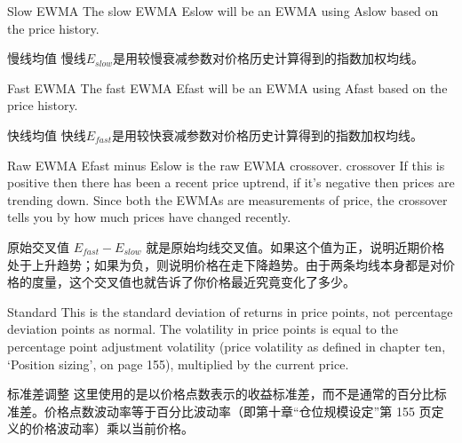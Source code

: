 \bipairgap

\begin{englishblock} Slow EWMA The slow EWMA Eslow will be an EWMA using Aslow based on the price history. \end{englishblock}

\begin{chineseblock}慢线均值 慢线\(E_{slow}\)是用较慢衰减参数对价格历史计算得到的指数加权均线。\end{chineseblock}

\bipairgap

\begin{englishblock} Fast EWMA The fast EWMA Efast will be an EWMA using Afast based on the price history. \end{englishblock}

\begin{chineseblock}快线均值 快线\(E_{fast}\)是用较快衰减参数对价格历史计算得到的指数加权均线。\end{chineseblock}

\bipairgap

\begin{englishblock} Raw EWMA Efast minus Eslow is the raw EWMA crossover. crossover If this is positive then there has been a recent price uptrend, if it's negative then prices are trending down. Since both the EWMAs are measurements of price, the crossover tells you by how much prices have changed recently. \end{englishblock}

\begin{chineseblock}原始交叉值 \(E_{fast} - E_{slow}\) 就是原始均线交叉值。如果这个值为正，说明近期价格处于上升趋势；如果为负，则说明价格在走下降趋势。由于两条均线本身都是对价格的度量，这个交叉值也就告诉了你价格最近究竟变化了多少。\end{chineseblock}

\bipairgap

\begin{englishblock} Standard This is the standard deviation of returns in price points, not percentage deviation points as normal. The volatility in price points is equal to the percentage point adjustment volatility (price volatility as defined in chapter ten, ‘Position sizing', on page 155), multiplied by the current price. \end{englishblock}

\begin{chineseblock}标准差调整 这里使用的是以价格点数表示的收益标准差，而不是通常的百分比标准差。价格点数波动率等于百分比波动率（即第十章“仓位规模设定”第 155 页定义的价格波动率）乘以当前价格。\end{chineseblock}

